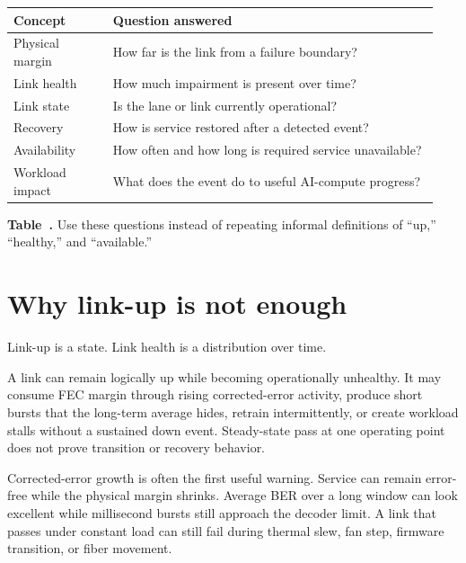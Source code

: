 \begin{table}[ht]
\label{tab:ops-concept-distinction}%
\centering
\setlength{\tabcolsep}{3pt}%
\footnotesize
\renewcommand{\arraystretch}{1.2}%
\begin{tabular}{@{}p{0.22\linewidth}p{0.72\linewidth}@{}}
\toprule
Concept & Question answered \\
\midrule
Physical margin &
How far is the link from a failure boundary? \\
\addlinespace[0.4em]
Link health &
How much impairment is present over time? \\
\addlinespace[0.4em]
Link state &
Is the lane or link currently operational? \\
\addlinespace[0.4em]
Recovery &
How is service restored after a detected event? \\
\addlinespace[0.4em]
Availability &
How often and how long is required service unavailable? \\
\addlinespace[0.4em]
Workload impact &
What does the event do to useful AI-compute progress? \\
\bottomrule
\end{tabular}
\par\medskip
{\raggedright\footnotesize\textbf{Table~\thetable.} Use these questions instead
of repeating informal definitions of ``up,'' ``healthy,'' and ``available.''\par}
\end{table}
\FloatBarrier

\section{Why link-up is not enough}
\label{sec:ops-linkup-not-enough}

Link-up is a state. Link health is a distribution over time.

A link can remain logically up while becoming operationally unhealthy. It may
consume FEC margin through rising corrected-error activity, produce short
bursts that the long-term average hides, retrain intermittently, or create
workload stalls without a sustained down event. Steady-state pass at one
operating point does not prove transition or recovery behavior.

Corrected-error growth is often the first useful warning. Service can remain
error-free while the physical margin shrinks. Average BER over a long window
can look excellent while millisecond bursts still approach the decoder limit.
A link that passes under constant load can still fail during thermal slew, fan
step, firmware transition, or fiber movement.

